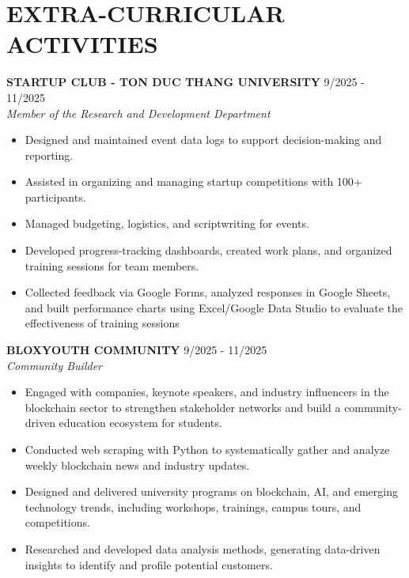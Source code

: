 \documentclass[12pt,a4paper]{article}
\begin{document}
\section{EXTRA-CURRICULAR ACTIVITIES}
\noindent \textbf{STARTUP CLUB - TON DUC THANG UNIVERSITY} \hfill 9/2025 - 11/2025 \\
\textit{Member of the Research and Development Department} 
    \begin{itemize}[leftmargin=*, noitemsep]
        \item Designed and maintained event data logs to support decision-making and reporting.
        \item Assisted in organizing and managing startup competitions with 100+ participants.
        \item Managed budgeting, logistics, and scriptwriting for events.
        \item Developed progress-tracking dashboards, created work plans, and organized training sessions for team members.
        \item Collected feedback via Google Forms, analyzed responses in Google Sheets, and built performance charts using Excel/Google Data Studio to evaluate the effectiveness of training sessions
    \end{itemize}
\noindent \textbf{BLOXYOUTH COMMUNITY} \hfill 9/2025 - 11/2025 \\
\textit{Community Builder} 
    \begin{itemize}[leftmargin=*, noitemsep]
        \item Engaged with companies, keynote speakers, and industry influencers in the blockchain sector to strengthen stakeholder networks and build a community-driven education ecosystem for students.
        \item Conducted web scraping with Python to systematically gather and analyze weekly blockchain news and industry updates.
        \item Designed and delivered university programs on blockchain, AI, and emerging technology trends, including workshops, trainings, campus tours, and competitions.
        \item Researched and developed data analysis methods, generating data-driven insights to identify and profile potential customers.
    \end{itemize}
\end{document}
